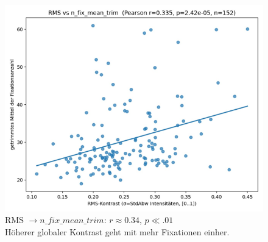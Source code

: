 \documentclass[
    language=german, %
    thesis=seminar, %
    supervisor=postdoc, %
    multiauthor=true, %
    ]{settings/csssa-thesis}
\begin{document}
\begin{figure}[h]
    \centering
    \includegraphics[width=\linewidth,height=0.8\textheight,keepaspectratio]{figures/Bild4.png}
    \caption{RMS $\rightarrow n\_fix\_mean\_trim$: $r \approx 0.34$, $p \ll .01$ \\
          Höherer globaler Kontrast geht mit mehr Fixationen einher. }\label{fig:bild4}
\end{figure}
\end{document}
